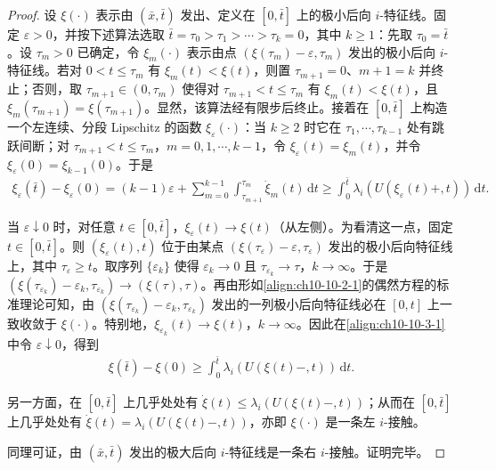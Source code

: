 \documentclass[../../main.tex]{subfiles}
\begin{document}
\begin{proof}
设 $\xi(\cdot)$ 表示由 $(\bar{x},\bar{t})$ 发出、定义在 $[0,\bar{t}]$ 上的极小后向 $i$-特征线。固定 $\varepsilon>0$，并按下述算法选取 $\bar{t}=\tau_{0}>\tau_{1}>\cdots>\tau_{k}=0$，其中 $k\geqslant1$：先取 $\tau_{0}=\bar{t}$。设 $\tau_{m}>0$ 已确定，令 $\xi_{m}(\cdot)$ 表示由点 $(\xi(\tau_{m})-\varepsilon,\tau_{m})$ 发出的极小后向 $i$-特征线。若对 $0<t\leqslant\tau_{m}$ 有 $\xi_{m}(t)<\xi(t)$，则置 $\tau_{m+1}=0$、$m+1=k$ 并终止；否则，取 $\tau_{m+1}\in(0,\tau_{m})$ 使得对 $\tau_{m+1}<t\leqslant\tau_{m}$ 有 $\xi_{m}(t)<\xi(t)$，且 $\xi_{m}(\tau_{m+1})=\xi(\tau_{m+1})$。显然，该算法经有限步后终止。接着在 $[0,\bar{t}]$ 上构造一个左连续、分段 Lipschitz 的函数 $\xi_{\varepsilon}(\cdot)$：当 $k\geqslant2$ 时它在 $\tau_{1},\cdots,\tau_{k-1}$ 处有跳跃间断；对 $\tau_{m+1}<t\leqslant\tau_{m}$，$m=0,1,\cdots,k-1$，令 $\xi_{\varepsilon}(t)=\xi_{m}(t)$，并令 $\xi_{\varepsilon}(0)=\xi_{k-1}(0)$。于是
\begin{align}
\xi_{\varepsilon}(\bar{t})-\xi_{\varepsilon}(0)=(k-1)\varepsilon+\sum_{m=0}^{k-1}\int_{\tau_{m+1}}^{\tau_{m}}\dot{\xi}_{m}(t)\,\mathrm{d}t
\geqslant\int_{0}^{\bar{t}}\lambda_{i}(U(\xi_{\varepsilon}(t)+,t))\,\mathrm{d}t.
\label{align:ch10-10-3-1}
\end{align}

当 $\varepsilon\downarrow0$ 时，对任意 $t\in[0,\bar{t}]$，$\xi_{\varepsilon}(t)\to\xi(t)$（从左侧）。为看清这一点，固定 $t\in[0,\bar{t}]$。则 $(\xi_{\varepsilon}(t),t)$ 位于由某点 $(\xi(\tau_{\varepsilon})-\varepsilon,\tau_{\varepsilon})$ 发出的极小后向特征线上，其中 $\tau_{\varepsilon}\geqslant t$。取序列 $\{\varepsilon_{k}\}$ 使得 $\varepsilon_{k}\to0$ 且 $\tau_{\varepsilon_{k}}\to\tau$，$k\to\infty$。于是 $(\xi(\tau_{\varepsilon_{k}})-\varepsilon_{k},\tau_{\varepsilon_{k}})\to(\xi(\tau),\tau)$。再由形如\eqref{align:ch10-10-2-1}的偶然方程的标准理论可知，由 $(\xi(\tau_{\varepsilon_{k}})-\varepsilon_{k},\tau_{\varepsilon_{k}})$ 发出的一列极小后向特征线必在 $[0,t]$ 上一致收敛于 $\xi(\cdot)$。特别地，$\xi_{\varepsilon_{k}}(t)\to\xi(t)$，$k\to\infty$。因此在\eqref{align:ch10-10-3-1}中令 $\varepsilon\downarrow0$，得到
\begin{align}
\xi(\bar{t})-\xi(0)\geqslant\int_{0}^{\bar{t}}\lambda_{i}(U(\xi(t)-,t))\,\mathrm{d}t.
\label{align:ch10-10-3-2}
\end{align}

另一方面，在 $[0,\bar{t}]$ 上几乎处处有 $\dot{\xi}(t)\leqslant\lambda_{i}(U(\xi(t)-,t))$；从而在 $[0,\bar{t}]$ 上几乎处处有 $\dot{\xi}(t)=\lambda_{i}(U(\xi(t)-,t))$，亦即 $\xi(\cdot)$ 是一条左 $i$-接触。

同理可证，由 $(\bar{x},\bar{t})$ 发出的极大后向 $i$-特征线是一条右 $i$-接触。证明完毕。
\end{proof}
\end{document}
